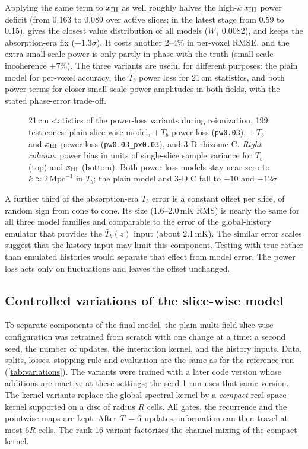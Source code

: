 Applying the same term to $x_{\mathrm{HI}}$ as well roughly halves the high-$k$ $x_{\mathrm{HI}}$ power deficit (from 0.163 to 0.089 over active slices; in the latest stage from 0.59 to 0.15), gives the closest value distribution of all models ($W_1$ 0.0082), and keeps the absorption-era fix ($+1.3\sigma$). It costs another 2--4\% in per-voxel RMSE, and the extra small-scale power is only partly in phase with the truth (small-scale incoherence $+7\%$). The three variants are useful for different purposes: the plain model for per-voxel accuracy, the $T_b$ power loss for 21\,cm statistics, and both power terms for closer small-scale power amplitudes in both fields, with the stated phase-error trade-off.

\begin{figure}[!tp]
  \centering
  \caption{21\,cm statistics of the power-loss variants during reionization, 199 test cones: plain slice-wise model, $+\,T_b$ power loss (\texttt{pw0.03}), $+\,T_b$ and $x_{\mathrm{HI}}$ power loss (\texttt{pw0.03\_px0.03}), and 3-D rhizome C. \emph{Right column:} power bias in units of single-slice sample variance for $T_b$ (top) and $x_{\mathrm{HI}}$ (bottom). Both power-loss models stay near zero to $k\approx2\,\mathrm{Mpc}^{-1}$ in $T_b$; the plain model and 3-D C fall to $-10$ and $-12\sigma$.}
  \label{fig:power-loss}
\end{figure}

A further third of the absorption-era $T_b$ error is a constant offset per slice, of random sign from cone to cone. Its size (1.6--2.0\,mK RMS) is nearly the same for all three model families and comparable to the error of the global-history emulator that provides the $\bar T_b(z)$ input (about 2.1\,mK). The similar error scales suggest that the history input may limit this component. Testing with true rather than emulated histories would separate that effect from model error. The power loss acts only on fluctuations and leaves the offset unchanged.

\subsection{Controlled variations of the slice-wise model}
\label{sec:results-variations}

To separate components of the final model, the plain multi-field slice-wise configuration was retrained from scratch with one change at a time: a second seed, the number of updates, the interaction kernel, and the history inputs. Data, splits, losses, stopping rule and evaluation are the same as for the reference run (\cref{tab:variations}). The variants were trained with a later code version whose additions are inactive at these settings; the seed-1 run uses that same version. The kernel variants replace the global spectral kernel by a \emph{compact} real-space kernel supported on a disc of radius $R$ cells. All gates, the recurrence and the pointwise maps are kept. After $T=6$ updates, information can then travel at most $6R$ cells. The rank-16 variant factorizes the channel mixing of the compact kernel.

